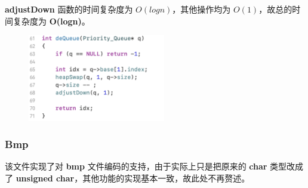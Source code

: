 \begin{itemize}
                    \par \textbf{adjustDown} 函数的时间复杂度为 $O(logn)$，其他操作均为 $O(1)$，故总的时间复杂度为 \textbf{O(logn)}。
                    \begin{figure}[htbp]
                        \hspace*{1.2cm}
                        \includegraphics*[width = 6cm]{s2_4.png}
                    \end{figure}
            \end{itemize}
        \subsubsection{Bmp}
            \par 该文件实现了对 \textbf{bmp} 文件编码的支持，由于实际上只是把原来的 \textbf{char} 类型改成了 \textbf{unsigned char}，其他功能的实现基本一致，故此处不再赘述。
    
    \newpage
